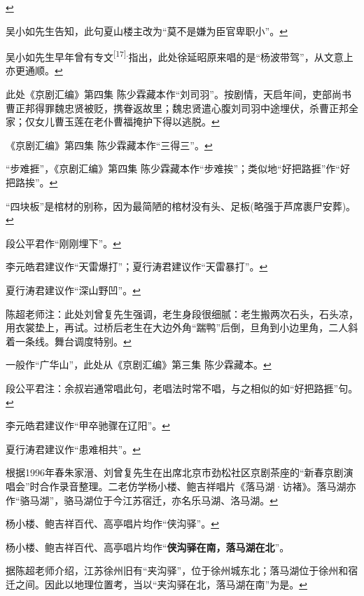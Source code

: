   \protect\hyperlink{fnref607}{↩}
\item
  \leavevmode\hypertarget{fn608}{}%
  吴小如先生告知，此句夏山楼主改为``莫不是嫌为臣官卑职小''。\protect\hyperlink{fnref608}{↩}
\item
  \leavevmode\hypertarget{fn609}{}%
  吴小如先生早年曾有专文\textsuperscript{{[}17{]}.}指出，此处徐延昭原来唱的是``杨波带驾''，从文意上亦更通顺。\protect\hyperlink{fnref609}{↩}
\item
  \leavevmode\hypertarget{fn610}{}%
  此处《京剧汇编》第四集
  陈少霖藏本作``刘司羽''。按剧情，天启年间，吏部尚书曹正邦得罪魏忠贤被贬，携眷返故里；魏忠贤遣心腹刘司羽中途埋伏，杀曹正邦全家；仅女儿曹玉莲在老仆曹福掩护下得以逃脱。\protect\hyperlink{fnref610}{↩}
\item
  \leavevmode\hypertarget{fn611}{}%
  《京剧汇编》第四集
  陈少霖藏本作``三得三''。\protect\hyperlink{fnref611}{↩}
\item
  \leavevmode\hypertarget{fn612}{}%
  ``步难捱''，《京剧汇编》第四集
  陈少霖藏本作``步难挨''；类似地``好把路捱''作``好把路挨''。\protect\hyperlink{fnref612}{↩}
\item
  \leavevmode\hypertarget{fn613}{}%
  ``四块板''是棺材的别称，因为最简陋的棺材没有头、足板(略强于芦席裹尸安葬)。\protect\hyperlink{fnref613}{↩}
\item
  \leavevmode\hypertarget{fn614}{}%
  段公平君作``刚刚埋下''。\protect\hyperlink{fnref614}{↩}
\item
  \leavevmode\hypertarget{fn615}{}%
  李元皓君建议作``天雷爆打''；夏行涛君建议作``天雷暴打''。\protect\hyperlink{fnref615}{↩}
\item
  \leavevmode\hypertarget{fn616}{}%
  夏行涛君建议作``深山野凹''。\protect\hyperlink{fnref616}{↩}
\item
  \leavevmode\hypertarget{fn617}{}%
  陈超老师注：此处刘曾复先生强调，老生身段很细腻：老生搬两次石头，石头凉，用衣裳垫上，再试。过桥后老生在大边外角``踹鸭''后倒，旦角到小边里角，二人斜着一条线。舞台调度特别。\protect\hyperlink{fnref617}{↩}
\item
  \leavevmode\hypertarget{fn618}{}%
  一般作``广华山''，此处从《京剧汇编》第三集
  陈少霖藏本。\protect\hyperlink{fnref618}{↩}
\item
  \leavevmode\hypertarget{fn619}{}%
  段公平君注：余叔岩通常唱此句，老唱法时常不唱，与之相似的如``好把路捱''句。\protect\hyperlink{fnref619}{↩}
\item
  \leavevmode\hypertarget{fn620}{}%
  李元皓君建议作``甲卒驰骤在辽阳''。\protect\hyperlink{fnref620}{↩}
\item
  \leavevmode\hypertarget{fn621}{}%
  夏行涛君建议作``患难相共''。\protect\hyperlink{fnref621}{↩}
\item
  \leavevmode\hypertarget{fn622}{}%
  根据1996年春朱家溍、刘曾复先生在出席北京市劲松社区京剧茶座的``新春京剧演唱会''时合作录音整理。二老仿学杨小楼、鲍吉祥唱片《落马湖·访褚》。落马湖亦作``骆马湖''，骆马湖位于今江苏宿迁，亦名乐马湖、洛马湖。\protect\hyperlink{fnref622}{↩}
\item
  \leavevmode\hypertarget{fn623}{}%
  杨小楼、鲍吉祥百代、高亭唱片均作``侠沟驿''。\protect\hyperlink{fnref623}{↩}
\item
  \leavevmode\hypertarget{fn624}{}%
  杨小楼、鲍吉祥百代、高亭唱片均作``\textbf{侠沟驿在南，落马湖在北}''。

  据陈超老师介绍，江苏徐州旧有``夹沟驿''，位于徐州城东北；落马湖位于徐州和宿迁之间。因此以地理位置考，当以``夹沟驿在北，落马湖在南''为是。\protect\hyperlink{fnref624}{↩}
\item
